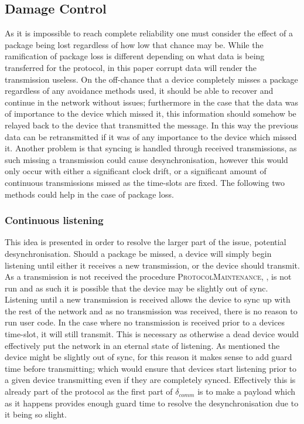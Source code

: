 \subsection{Damage Control}
As it is impossible to reach complete reliability one must consider the effect of a package being lost regardless of how low that chance may be.
While the ramification of package loss is different depending on what data is being transferred for the protocol, in this paper corrupt data will render the transmission useless.
On the off-chance that a device completely misses a package regardless of any avoidance methods used, it should be able to recover and continue in the network without issues; furthermore in the case that the data was of importance to the device which missed it, this information should somehow be relayed back to the device that transmitted the message.
In this way the previous data can be retransmitted if it was of any importance to the device which missed it.
Another problem is that syncing is handled through received transmissions, as such missing a transmission could cause desynchronisation, however this would only occur with either a significant clock drift, or a significant amount of continuous transmissions missed as the time-slots are fixed.
The following two methods could help in the case of package loss.

\subsubsection*{Continuous listening}\label{contListen}
This idea is presented in order to resolve the larger part of the issue, potential desynchronisation.
Should a package be missed, a device will simply begin listening until either it receives a new transmission, or the device should transmit.
As a transmission is not received the procedure \textsc{ProtocolMaintenance}, , is not run and as such it is possible that the device may be slightly out of sync.
Listening until a new transmission is received allows the device to sync up with the rest of the network and as no transmission was received, there is no reason to run user code.
In the case where no transmission is received prior to a devices time-slot, it will still transmit.
This is necessary as otherwise a dead device would effectively put the network in an eternal state of listening.
As mentioned the device might be slightly out of sync, for this reason it makes sense to add guard time before transmitting; which would ensure that devices start listening prior to a given device transmitting even if they are completely synced.
Effectively this is already part of the protocol as the first part of $\delta_{comm}$ is to make a payload which as it happens provides enough guard time to resolve the desynchronisation due to it being so slight.

